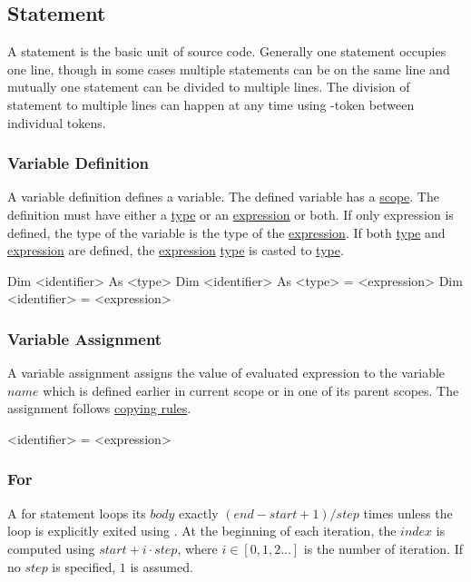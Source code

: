 \subsection{Statement}
\label{statement}
A statement is the basic unit of source code.
Generally one statement occupies one line,
though in some cases multiple statements can be on the same line
and mutually one statement can be divided to multiple lines.
The division of statement to multiple lines can happen
at any time using \token{\string_}-token between individual tokens.

\subsubsection{Variable Definition}
\label{stat:vardes}
A variable definition defines a variable.
The defined variable has a \hyperref[scope]{scope}.
The definition must have either a \hyperref[type]{type} or an \hyperref[expr]{expression} or both.
If only expression is defined, the type of the variable is the type of the \hyperref[expr]{expression}.
If both \hyperref[type]{type} and \hyperref[expr]{expression} are defined, the \hyperref[expr]{expression} \hyperref[type]{type} is casted to \hyperref[type]{type}.

\begin{grammar}
Dim <identifier> As <type>
Dim <identifier> As <type> = <expression>
Dim <identifier> = <expression>
\end{grammar}

\subsubsection{Variable Assignment}
\label{stat:varass}
A variable assignment assigns the value of evaluated expression to the variable $name$
which is defined earlier in current scope or in one of its parent scopes.
The assignment follows \hyperref[copying]{copying rules}.

\begin{grammar}
<identifier> = <expression>
\end{grammar}

\subsubsection{For}
\label{stat:for}
A for statement loops its $body$ exactly $(end - start + 1) / step$ times
unless the loop is explicitly exited using .
At the beginning of each iteration,
the $index$ is computed using $start + i \cdot step$,
where $i \in [0, 1, 2 ...]$ is the number of iteration.
If no $step$ is specified, $1$ is assumed.

